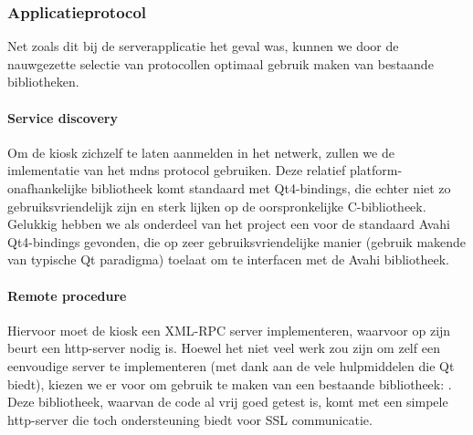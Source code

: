 \documentclass[verslag.tex]{subfiles}
\begin{document}
\subsubsection{Applicatieprotocol}

Net zoals dit bij de serverapplicatie het geval was, kunnen we door de nauwgezette selectie van protocollen optimaal gebruik maken van bestaande bibliotheken.

\paragraph{Service discovery} Om de kiosk zichzelf te laten aanmelden in het netwerk, zullen we de  imlementatie van het \ac{mdns} protocol gebruiken. Deze relatief platform-onafhankelijke bibliotheek komt standaard met Qt4-bindings, die echter niet zo gebruiksvriendelijk zijn en sterk lijken op de oorspronkelijke C-bibliotheek. Gelukkig hebben we als onderdeel van het  project een  voor de standaard Avahi Qt4-bindings gevonden, die op zeer gebruiksvriendelijke manier (gebruik makende van typische Qt paradigma) toelaat om te interfacen met de Avahi bibliotheek.

\paragraph{Remote procedure} Hiervoor moet de kiosk een XML-RPC server implementeren, waarvoor op zijn beurt een \ac{http}-server nodig is. Hoewel het niet veel werk zou zijn om zelf een eenvoudige server te implementeren (met dank aan de vele hulpmiddelen die Qt biedt), kiezen we er voor om gebruik te maken van een bestaande bibliotheek: . Deze bibliotheek, waarvan de code al vrij goed getest is, komt met een simpele \ac{http}-server die toch ondersteuning biedt voor SSL communicatie.
\end{document}

